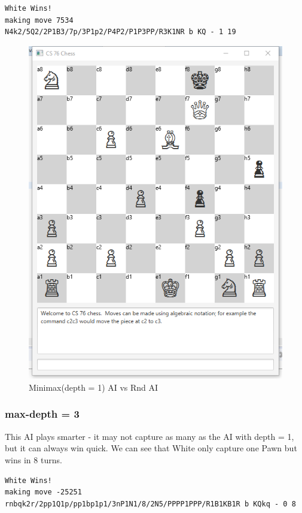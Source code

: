 \documentclass{article}
\begin{document}
\begin{lstlisting}
White Wins!
making move 7534
N4k2/5Q2/2P1B3/7p/3P1p2/P4P2/P1P3PP/R3K1NR b KQ - 1 19
\end{lstlisting}
\begin{figure}[H]
\centering
\includegraphics[width=0.7\linewidth]{max_1_rnd}
\caption{Minimax(depth = 1) AI vs Rnd AI}
\end{figure}

\clearpage
\subsubsection{max-depth = 3}
This AI plays smarter - it may not capture as many as the AI with depth = 1, but it can always win quick. We can see that White only capture one Pawn but wins in 8 turns.
\begin{lstlisting}
White Wins!
making move -25251
rnbqk2r/2pp1Q1p/pp1bp1p1/3nP1N1/8/2N5/PPPP1PPP/R1B1KB1R b KQkq - 0 8
\end{lstlisting}
\end{document}
